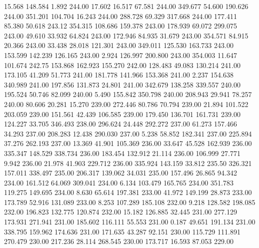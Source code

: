   15.568  148.584    1.892       244.00
  17.602   16.517   67.581       244.00
 349.677   54.600  190.626       244.00
 351.201  104.704   16.243       244.00
 288.728   69.329  317.668       244.00
 177.411   85.380   50.618       243.12
 354.315  108.686  159.378       243.00
 178.939   69.072  299.075       243.00
  49.610   33.932   64.824       243.00
 172.946   84.935   31.679       243.00
 354.571   84.915   20.366       243.00
  33.438   28.018  121.301       243.00
 349.011  125.530  163.733       243.00
 153.599  142.239  126.165       243.00
   2.924  126.997  200.800       243.00
 354.003   11.647  101.674       242.75
 153.868  162.923  155.270       242.00
 128.483   49.083  130.214       241.00
 173.105   41.209   51.773       241.00
 181.778  141.966  153.368       241.00
   2.237  154.638  340.989       241.00
 197.856  131.873   24.801       241.00
 342.679  138.258  339.557       240.00
 195.524   50.746   82.099       240.00
   5.490  155.842  350.798       240.00
 208.943   29.941   78.257       240.00
  80.606   20.281   15.270       239.00
 272.446   80.786   70.794       239.00
  21.894  101.522  203.059       239.00
 151.561   42.439  106.585       239.00
 179.450  136.701  161.731       239.00
 124.227   33.705  346.493       238.00
 296.624   24.448  292.272       237.00
  61.273  157.466   34.293       237.00
 208.283   12.438  290.030       237.00
   5.238   58.852  182.341       237.00
 225.894   37.276  262.193       237.00
  13.369   41.901  105.369       236.00
  33.647   45.528  162.939       236.00
 335.347  148.529  338.734       236.00
 183.454  132.912   21.114       236.00
 106.999   27.771    9.942       236.00
  21.978   41.903  229.712       236.00
 335.924  143.159   33.812       235.50
 326.321  157.011  338.497       235.00
 206.317  139.062   34.031       235.00
 157.496   26.865   94.342       234.00
 161.512   64.069  309.041       234.00
   6.134  103.479  165.765       234.00
 351.783  119.275  149.695       234.00
   8.630   65.614  197.381       233.00
  41.972  149.199   28.873       233.00
 173.789   52.916  131.089       233.00
   8.253  107.289  185.108       232.00
   9.218  128.582  198.085       232.00
 196.823  132.775  120.874       232.00
  15.182  126.885   32.445       231.00
 277.129  173.931  271.941       231.00
 185.602  116.111   55.553       231.00
   0.187   49.651  191.134       231.00
 338.795  159.962  174.636       231.00
 171.635   43.287   92.151       230.00
 115.729  111.891  270.479       230.00
 217.236   28.114  268.545       230.00
 173.717   16.593   87.053       229.00
